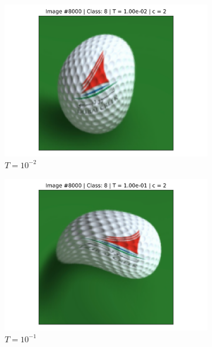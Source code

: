 \begin{figure}[!h]
\begin{subfigure}{0.18\textwidth}
    \includegraphics[width=\textwidth]{ch1-diffy/figures/warping_examples/8000_2_1.png}
    \caption{$T=10^{-2}$}
    \end{subfigure}
    \begin{subfigure}{0.18\textwidth}
    \includegraphics[width=\textwidth]{ch1-diffy/figures/warping_examples/8000_1_1.png}
    \caption{$T=10^{-1}$}
    \end{subfigure}
    \begin{subfigure}{0.18\textwidth}

\end{subfigure}
\end{figure}
